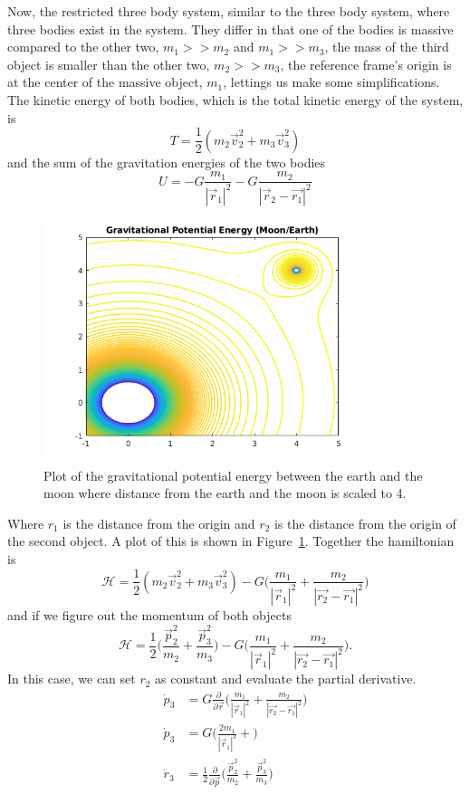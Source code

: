 \documentclass{article}
\begin{document}
Now, the restricted three body system, similar to the three body system, where three bodies exist in the system. They differ in that one of the bodies is massive compared to the other two, $m_1>>m_2$ and $m_1>>m_3$, the mass of the third object is smaller than the other two, $m_2>>m_3$, the reference frame's origin is at the center of the massive object, $m_1$, lettings us make some simplifications. The kinetic energy of both bodies, which is the total kinetic energy of the system, is 
$$T=\frac{1}{2}(m_2\vec{v}_2^2+m_3\vec{v}_3^2)$$ and the sum of the gravitation energies of the two bodies 
$$U=-G\frac{m_1}{|\vec{r}_1|^2}-G\frac{m_2}{|\vec{r}_2-\vec{r_1}|^2}$$
\begin{figure}
\includegraphics[width=0.85\textwidth]{gravpoten}
\centering
\caption{Plot of the gravitational potential energy between the earth and the moon where distance from the earth and the moon is scaled to 4.}\label{fig:gravpot}
\end{figure}
 Where $r_1$ is the distance from the origin and $r_2$ is the distance from the origin of the second object. A plot of this is shown in Figure~\ref{fig:gravpot}.
Together the hamiltonian is $$\mathcal{H}=\frac{1}{2}(m_2\vec{v}_2^2+m_3\vec{v}_3^2)-G\bigg(\frac{m_1}{|\vec{r}_1|^2}+\frac{m_2}{|\vec{r_2}-\vec{r_1}|^2}\bigg)$$
and if we figure out the momentum of both objects
$$\mathcal{H}=\frac{1}{2}\bigg(\frac{\vec{p}_2^2}{m_2}+\frac{\vec{p}_3^2}{m_3}\bigg)-G\bigg(\frac{m_1}{|\vec{r}_1|^2}+\frac{m_2}{|\vec{r_2}-\vec{r_1}|^2}\bigg).$$ In this case, we can set $r_2$ as constant and evaluate the partial derivative.
\begin{align*}
\dot{p}_3&=G\frac{\partial}{\partial \vec{r}}\bigg(\frac{m_1}{|\vec{r}_1|^2}+\frac{m_2}{|\vec{r_2}-\vec{r_1}|^2}\bigg)\\
\dot{p}_3&=G\bigg(\frac{2m_1}{|\vec{r}_1|^3}+\bigg)\\
\dot{r}_3&=\frac{1}{2}\frac{\partial}{\partial \vec{p}}\bigg(\frac{\vec{p}_2^2}{m_2}+\frac{\vec{p}_3^2}{m_3}\bigg)
\end{align*}
\end{document}
